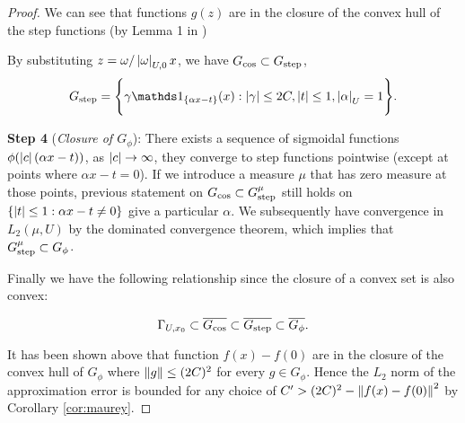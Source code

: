 \begin{proof}
    We can see that functions $g(z)$ are in the closure of the convex hull of
    the step functions (by Lemma 1 in
    \cite{barronUniversalApproximationBounds1993})

    By substituting $z = \omega/\left| \omega \right|_{U, 0} x$, we have $G_{\cos}
    \subset G_{\textnormal{step}}$,
    \begin{equation}
        G_{\textnormal{step}} = \Bigg\{
            \gamma\indicator{\{\alpha x-t\}}(x):
            \abs{\gamma} \leq 2C,
            \abs{t} \leq 1,
            \abs{\alpha}_{U} = 1
        \Bigg\}.
    \end{equation}

    \textbf{Step 4} (\textit{Closure of $G_{\phi}$}): There exists a sequence of
    sigmoidal functions $\phi(\left| c \right|(\alpha x - t))$, as $\left| c \right| \to \infty$,
    they converge to step functions pointwise (except at points where $\alpha x
    - t = 0$). If we introduce a measure $\mu$ that has zero measure at those
    points, previous statement on $G_{\cos} \subset G^{\mu}_{\textnormal{step}}$
    still holds on $\{\left| t \right| \leq 1: \alpha x - t \not=0\}$ give a particular
    $\alpha$. We subsequently have convergence in $L_2(\mu, U)$ by the dominated
    convergence theorem, which implies that $G^{\mu}_{\textnormal{step}} \subset
    G_{\phi}$.

    Finally we have the following relationship since the closure of a convex set
    is also convex:

    \begin{equation*}
        \Gamma_{U, x_0} \subset \overline{G_{\cos}} 
        \subset \overline{G_{\textnormal{step}}} \subset \overline{G_{\phi}}.
    \end{equation*}




    It has been shown above that function $f(x) - f(0)$ are in the closure of
    the convex hull of $G_{\phi}$ where $\left\| g \right\| \leq (2C)^2$ for every $g \in
    G_{\phi}$. Hence the $L_2$ norm of the approximation error is bounded for
    any choice of $C' > (2C)^2 - \left\| f(x) - f(0) \right\|^2$ by Corollary
    \ref{cor:maurey}.




\end{proof}


